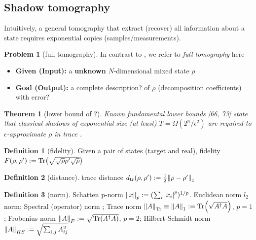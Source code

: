 \documentclass[
10pt,
aps,
pra,
linenumbers,
floatfix,
]{revtex4-2}
\theoremstyle{plain}
\newtheorem{theorem}{Theorem}
\theoremstyle{definition}
\newtheorem{definition}{Definition}
\newtheorem{problem}{Problem}
\newcommand{\dm}{\rho}
\begin{document}
\subsection{Shadow tomography}
Intuitively, a general tomography \cite{altepeterPhotonicStateTomography2005} that extract (recover) all information about a state requires exponential copies (samples/measurements).
\begin{problem}[full tomography]\label{prm:full_tomography}
	In contrast to , we refer to \emph{full tomography} here
	\begin{itemize}
		\item \textbf{Given (Input):} a \textbf{unknown} $N$-dimensional mixed state $\dm$
		\item \textbf{Goal (Output):} a complete description? of $\dm$ (decomposition coefficients) with error?
	\end{itemize}
\end{problem}
\begin{theorem}[lower bound of ?\cite{haahSampleoptimalTomographyQuantum2017}]
	Known fundamental lower bounds [66, 73] state that classical shadows of exponential size (at least) $T = \Omega( 2^n / \epsilon^2)$ are required to $\epsilon$-approximate $\dm$ in trace .
\end{theorem}
\begin{definition}[fidelity]\label{def:fidelity}
	Given a pair of states (target and real), 
	fidelity $F(\rho,\rho') : = \Tr(\sqrt{\sqrt{\rho}\rho'\sqrt{\rho}})$
\end{definition}
\begin{definition}[distance]\label{def:distance}
	trace distance $d_{\tr}(\rho,\rho') : = \frac{1}{2} \norm{\rho-\rho'}_1$
\end{definition}
\begin{definition}[norm]\label{def:norm}
	Schatten p-norm $\norm{x}_p:= (\sum_i \abs{x_i}^p)^{1/p}$.
	Euclidean norm $l_2$ norm;
	Spectral (operator) norm ;
	Trace norm $\norm{A}_{\Tr}\equiv\norm{A}_{1}:=\Tr(\sqrt{A^\dagger A})$, $p=1$;
	Frobenius norm $\norm{A}_{F}:=\sqrt{\Tr(A^\dagger A)}$, $p=2$;
	Hilbert-Schmidt norm $\norm{A}_{HS}:=\sqrt{\sum_{i,j} A_{ij}^2 }$
\end{definition}
\end{document}
